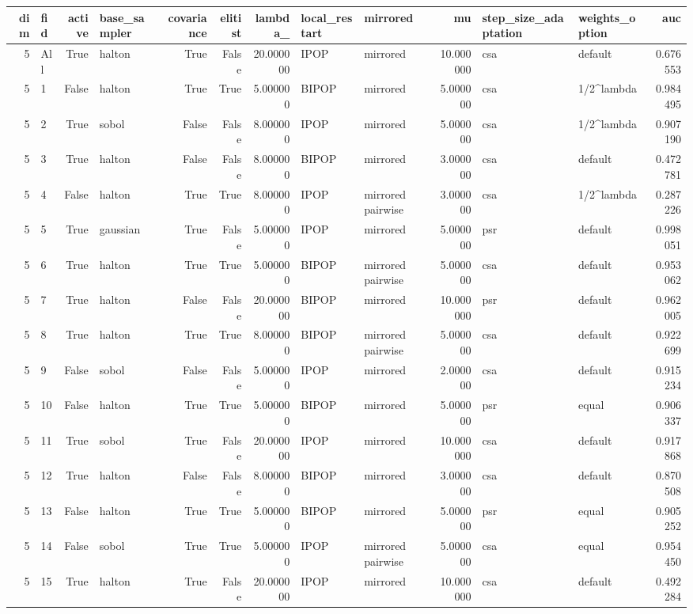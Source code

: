 \begin{tabular}{rlrlrrrllrllr}
\toprule
dim & fid & active & base_sampler & covariance & elitist & lambda_ & local_restart & mirrored & mu & step_size_adaptation & weights_option & auc \\
\midrule
5 & All & True & halton & True & False & 20.000000 & IPOP & mirrored & 10.000000 & csa & default & 0.676553 \\
5 & 1 & False & halton & True & True & 5.000000 & BIPOP & mirrored & 5.000000 & csa & 1/2^lambda & 0.984495 \\
5 & 2 & True & sobol & False & False & 8.000000 & IPOP & mirrored & 5.000000 & csa & 1/2^lambda & 0.907190 \\
5 & 3 & True & halton & False & False & 8.000000 & BIPOP & mirrored & 3.000000 & csa & default & 0.472781 \\
5 & 4 & False & halton & True & True & 8.000000 & IPOP & mirrored pairwise & 3.000000 & csa & 1/2^lambda & 0.287226 \\
5 & 5 & True & gaussian & True & False & 5.000000 & IPOP & mirrored & 5.000000 & psr & default & 0.998051 \\
5 & 6 & True & halton & True & True & 5.000000 & BIPOP & mirrored pairwise & 5.000000 & csa & default & 0.953062 \\
5 & 7 & True & halton & False & False & 20.000000 & BIPOP & mirrored & 10.000000 & psr & default & 0.962005 \\
5 & 8 & True & halton & True & True & 8.000000 & BIPOP & mirrored pairwise & 5.000000 & csa & default & 0.922699 \\
5 & 9 & False & sobol & False & False & 5.000000 & IPOP & mirrored & 2.000000 & csa & default & 0.915234 \\
5 & 10 & False & halton & True & True & 5.000000 & BIPOP & mirrored & 5.000000 & psr & equal & 0.906337 \\
5 & 11 & True & sobol & True & False & 20.000000 & IPOP & mirrored & 10.000000 & csa & default & 0.917868 \\
5 & 12 & True & halton & False & False & 8.000000 & BIPOP & mirrored & 3.000000 & csa & default & 0.870508 \\
5 & 13 & False & halton & True & True & 5.000000 & BIPOP & mirrored & 5.000000 & psr & equal & 0.905252 \\
5 & 14 & False & sobol & True & True & 5.000000 & IPOP & mirrored pairwise & 5.000000 & csa & equal & 0.954450 \\
5 & 15 & True & halton & True & False & 20.000000 & IPOP & mirrored & 10.000000 & csa & default & 0.492284 \\

\end{tabular}
